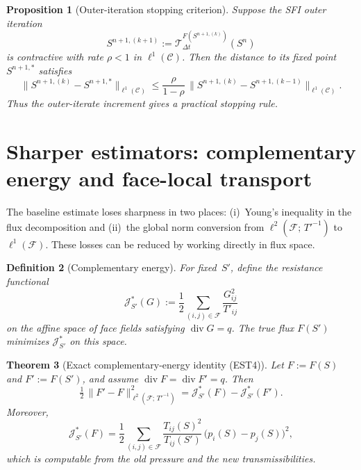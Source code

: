 \documentclass[11pt]{article}
\newtheorem{theorem}{Theorem}[section]
\newtheorem{proposition}[theorem]{Proposition}
\newtheorem{definition}[theorem]{Definition}
\begin{document}
\begin{proposition}[Outer-iteration stopping criterion]\label{prop:outer}
Suppose the SFI outer iteration
\[
  S^{n+1,(k+1)}
    := \mathcal{T}^{F(S^{n+1,(k)})}_{\Delta t}(S^n)
\]
is contractive with rate $\rho<1$ in $\ell^1(\mathcal{C})$.  Then the distance
to its fixed point~$S^{n+1,*}$ satisfies
\[
  \|S^{n+1,(k)} - S^{n+1,*}\|_{\ell^1(\mathcal{C})}
    \le \frac{\rho}{1-\rho}\,
        \|S^{n+1,(k)} - S^{n+1,(k-1)}\|_{\ell^1(\mathcal{C})}.
\]
Thus the outer-iterate increment gives a practical stopping rule.
\end{proposition}

\section{Sharper estimators: complementary energy and face-local transport}
\label{sec:sharp}

The baseline estimate loses sharpness in two places: (i)~Young's inequality in
the flux decomposition and (ii)~the global norm conversion from
$\ell^2(\mathcal{F};\,T'^{-1})$ to $\ell^1(\mathcal{F})$.  These losses can
be reduced by working directly in flux space.

\begin{definition}[Complementary energy]\label{def:comp-energy}
For fixed~$S'$, define the resistance functional
\[
  \mathcal{J}^*_{S'}(G)
    := \frac{1}{2}\sum_{(i,j)\in\mathcal{F}}
         \frac{G_{ij}^2}{T'_{ij}}
\]
on the affine space of face fields satisfying $\operatorname{div} G = q$.  The
true flux $F(S')$ minimizes $\mathcal{J}^*_{S'}$ on this space.
\end{definition}

\begin{theorem}[Exact complementary-energy identity (EST4)]
\label{thm:comp-energy}
Let $F := F(S)$ and $F' := F(S')$, and assume
$\operatorname{div} F = \operatorname{div} F' = q$.  Then
\begin{equation}\label{eq:comp-energy}
  \tfrac{1}{2}\,\|F' - F\|^2_{\ell^2(\mathcal{F};\,T'^{-1})}
    = \mathcal{J}^*_{S'}(F) - \mathcal{J}^*_{S'}(F').
\end{equation}
Moreover,
\[
  \mathcal{J}^*_{S'}(F)
    = \frac{1}{2}\sum_{(i,j)\in\mathcal{F}}
        \frac{T_{ij}(S)^2}{T_{ij}(S')}\,
        \bigl(p_i(S) - p_j(S)\bigr)^2,
\]
which is computable from the old pressure and the new transmissibilities.
\end{theorem}
\end{document}
